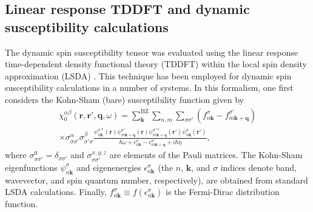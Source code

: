 \subsection{Linear response TDDFT and dynamic susceptibility calculations}

The dynamic spin susceptibility tensor was evaluated using the linear response time-dependent density functional theory (TDDFT) within the local spin density approximation (LSDA) \citep{Gross}. This technique has been employed for dynamic spin susceptibility calculations in a number of systems\citep{Savrasov,Staunton,Costa,Buczek,Bergara,Lounis}. In this formalism, one first considers the Kohn-Sham (bare) susceptibility function given by
\begin{eqnarray}
\nonumber
\chi_0^{\alpha\beta}(\mathbf{r},\mathbf{r}',\mathbf{q},\omega)=\sum_{\mathbf{k}}^{\text{BZ}}\sum_{n,m}\sum_{\sigma\sigma'}\left(f^{\sigma}_{n\mathbf{k}}-f^{\sigma'}_{m\mathbf{k}+\mathbf{q}}\right) \\
\times\sigma_{\sigma\sigma'}^{\alpha}\sigma_{\sigma'\sigma}^{\beta}\frac{\psi^{\sigma*}_{n\mathbf{k}}(\mathbf{r})\psi^{\sigma'}_{m\mathbf{k}+\mathbf{q}}(\mathbf{r})\psi^{\sigma'*}_{m\mathbf{k}+\mathbf{q}}(\mathbf{r}')\psi^{\sigma}_{n\mathbf{k}}(\mathbf{r}')}{\hbar\omega+\epsilon^\sigma_{n\mathbf{k}}-\epsilon^{\sigma'}_{m\mathbf{k}+\mathbf{q}}+i\hbar\eta},
\label{chi0}
\end{eqnarray}
where $\sigma_{\sigma\sigma'}^{0}=\delta_{\sigma\sigma'}$ and $\sigma_{\sigma\sigma'}^{x,y,z}$ are elements of the Pauli matrices. The Kohn-Sham eigenfunctions $\psi^\sigma_{n\mathbf{k}}$ and eigenenergies $\epsilon^{\sigma}_{n\mathbf{k}}$ (the $n$, $\mathbf{k}$, and $\sigma$ indices denote band, wavevector, and spin quantum number, respectively), are obtained from standard LSDA calculations. Finally, $f^\sigma_{n\mathbf{k}}\equiv f(\epsilon^\sigma_{n\mathbf{k}})$ is the Fermi-Dirac distribution function. 

